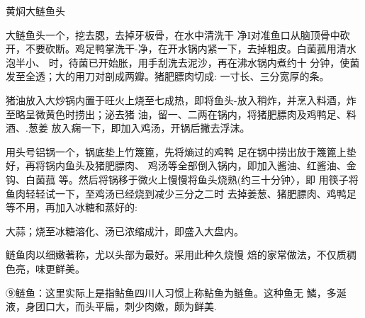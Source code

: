 \begin{recipe}{黄焖大鲢鱼头}

\ingredients









\cooking

\step 	大鲢鱼头一个，挖去腮，去掉牙板骨，在水中清洗干 净I对准鱼口从脑顶骨中砍开，不要砍断。鸡足鸭掌洗干-净，在开水锅内紧一下，去掉粗皮。白菌菰用清水泡半小、 时，待菌已开始胀，用手刮洗去泥沙，再在沸水锅内煮约十 分钟，使菌发至全透；大的用刀对剖成两瓣。猪肥膘肉切成: 一寸长、三分宽厚的条。

\step 	猪油放入大炒锅内置于旺火上烧至七成热，即将鱼头-放入稍炸，并烹入料酒，炸至略呈微黄色时捞出；泌去猪 油，留一、二两在锅内，将猪肥膘肉及鸡鸭足、料酒、.葱姜 放入痫一下，即加入鸡汤，开锅后撇去浮沫。

\step 	用头号铝锅一个，锅底垫上竹篾篦，先将熵过的鸡鸭 足在锅中捞出放于篾篦上垫好，再将锅内鱼头及猪肥膘肉、 鸡汤等全部倒入锅内，即加入酱油、红酱油、金钩、白菌菰 等。然后将锅移于微火上慢慢将鱼头烧熟(约三十分钟〉，即 用筷子将鱼肉轻轻试一下，至鸡汤已经烧到减少三分之二时 去掉姜葱、猪肥膘肉、鸡鸭足等不用，再加入冰糖和蒸好的:

大蒜；烧至冰糖溶化、汤已浓缩成汁，即盛入大盘内。

\notes

鲢鱼肉以细嫩著称，尤以头部为最好。采用此种久烧慢 焙的家常做法，不仅质稠色亮，味更鲜美。

⑨鲢鱼：这里实际上是指鲇鱼四川人习惯上称鲇鱼为鲢鱼。这种鱼无 鱗，多涎液，身团口大，而头平扁，刺少肉嫩，颇为鲜美.

\end{recipe}

